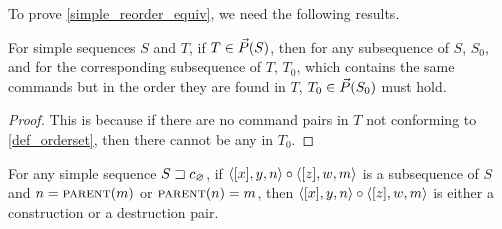 To prove \cref{simple_reorder_equiv}, we need the following results.

\begin{myclm}
For simple sequences $S$ and $T$,
if $T\in\vec{P}({S})$, then for any subsequence of $S$, $S_0$,
and for the corresponding subsequence of $T$, $T_0$, which
contains the same commands but in the order they are found in $T$,
$T_0\in\vec{P}({S_0})$ must hold.
\end{myclm}
\begin{proof}
This is because
if there are no command pairs in $T$ not conforming to \cref{def_orderset},
then there cannot be any in $T_0$.
\end{proof}

\begin{mylem}
For any simple sequence ${S}\sqsupset c_\varnothing$,
if $\langle{[x],y,n}\rangle\circ\langle{[z],w,m}\rangle$ is a subsequence of $S$ and $n=\text{\normalfont\scshape{parent}}(m)$ or $\text{\normalfont\scshape{parent}}(n)=m$,
then $\langle{[x],y,n}\rangle\circ\langle{[z],w,m}\rangle$ is either a construction or a destruction pair.
\end{mylem}
